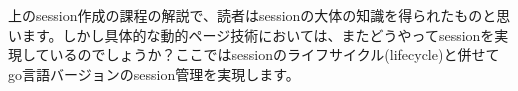 上のsession作成の課程の解説で、読者はsessionの大体の知識を得られたものと思います。しかし具体的な動的ページ技術においては、またどうやってsessionを実現しているのでしょうか？ここではsessionのライフサイクル(lifecycle)と併せてgo言語バージョンのsession管理を実現します。
